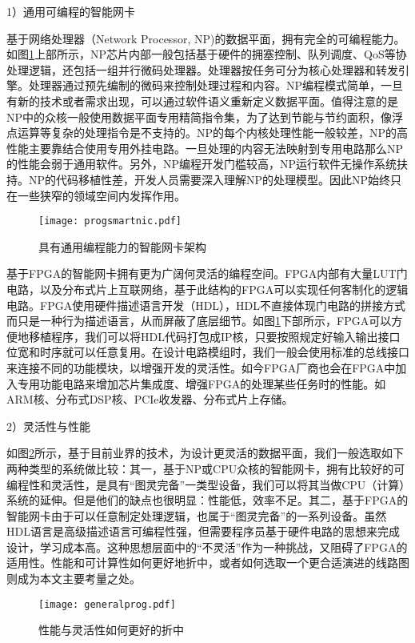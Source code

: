 1）通用可编程的智能网卡

基于网络处理器（Network Processor, NP)的数据平面，拥有完全的可编程能力。如图\ref{fig:progsmartnic1}上部所示，NP芯片内部一般包括基于硬件的拥塞控制、队列调度、QoS等协处理逻辑，还包括一组并行微码处理器。处理器按任务可分为核心处理器和转发引擎。处理器通过预先编制的微码来控制处理过程和内容。NP编程模式简单，一旦有新的技术或者需求出现，可以通过软件语义重新定义数据平面。值得注意的是NP中的众核一般使用数据平面专用精简指令集，为了达到节能与节约面积，像浮点运算等复杂的处理指令是不支持的。NP的每个内核处理性能一般较差，NP的高性能主要靠结合使用专用外挂电路。一旦处理的内容无法映射到专用电路那么NP的性能会弱于通用软件。另外，NP编程开发门槛较高，NP运行软件无操作系统扶持。NP的代码移植性差，开发人员需要深入理解NP的处理模型。因此NP始终只在一些狭窄的领域空间内发挥作用。

\begin{figure}[!ht]
	\centering
	\texttt{[image: progsmartnic.pdf]}
	\caption{具有通用编程能力的智能网卡架构} \label{fig:progsmartnic1}
\end{figure}

基于FPGA的智能网卡拥有更为广阔何灵活的编程空间。FPGA内部有大量LUT门电路，以及分布式片上互联网络，基于此结构的FPGA可以实现任何客制化的逻辑电路。FPGA使用硬件描述语言开发（HDL），HDL不直接体现门电路的拼接方式而只是一种行为描述语言，从而屏蔽了底层细节。如图\ref{fig:progsmartnic1}下部所示，FPGA可以方便地移植程序，我们可以将HDL代码打包成IP核，只要按照规定好输入输出接口位宽和时序就可以任意复用。在设计电路模组时，我们一般会使用标准的总线接口来连接不同的功能模块，以增强开发的灵活性。如今FPGA厂商也会在FPGA中加入专用功能电路来增加芯片集成度、增强FPGA的处理某些任务时的性能。如ARM核、分布式DSP核、PCIe收发器、分布式片上存储。

2）灵活性与性能

如图\ref{fig:generalprog}所示，基于目前业界的技术，为设计更灵活的数据平面，我们一般选取如下两种类型的系统做比较：其一，基于NP或CPU众核的智能网卡，拥有比较好的可编程性和灵活性，是具有“图灵完备”一类型设备，我们可以将其当做CPU（计算）系统的延伸。但是他们的缺点也很明显：性能低，效率不足。其二，基于FPGA的智能网卡由于可以任意制定处理逻辑，也属于“图灵完备”的一系列设备。虽然HDL语言是高级描述语言可编程性强，但需要程序员基于硬件电路的思想来完成设计，学习成本高。这种思想层面中的“不灵活”作为一种挑战，又阻碍了FPGA的适用性。性能和可计算性如何更好地折中，或者如何选取一个更合适演进的线路图则成为本文主要考量之处。

\begin{figure}[!ht]
	\centering
	\texttt{[image: generalprog.pdf]}
	\caption{性能与灵活性如何更好的折中} \label{fig:generalprog}
\end{figure}




